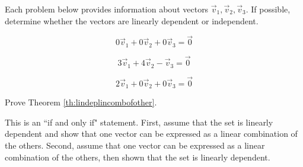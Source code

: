 \documentclass{ximera}
\begin{document}
\begin{problem}
Each problem below provides information about vectors $\vec{v}_1, \vec{v}_2, \vec{v}_3$.  If possible, determine whether the vectors are linearly dependent or independent.

\begin{problem}\label{prob:linindmultchoice5}
$$0\vec{v}_1+ 0\vec{v}_2+ 0\vec{v}_3=\vec{0}$$
\begin{multipleChoice}
 \end{multipleChoice}
\end{problem}

\begin{problem}\label{prob:linindmultchoice6}
$$3\vec{v}_1+ 4\vec{v}_2- \vec{v}_3=\vec{0}$$
\begin{multipleChoice}
 \end{multipleChoice}
\end{problem}

\begin{problem}\label{prob:linindmultchoice7}
$$2\vec{v}_1+ 0\vec{v}_2+ 0\vec{v}_3=\vec{0}$$
\begin{multipleChoice}
 \end{multipleChoice}
\end{problem}

\end{problem}

\begin{problem}\label{prob:lindeplincombofother}
Prove Theorem \ref{th:lindeplincombofother}.
\begin{hint}
This is an ``if and only if" statement.  First, assume that the set is linearly dependent and show that one vector can be expressed as a linear combination of the others.  Second, assume that one vector can be expressed as a linear combination of the others, then shown that the set is linearly dependent.
\end{hint}
\end{problem}
\end{document}

